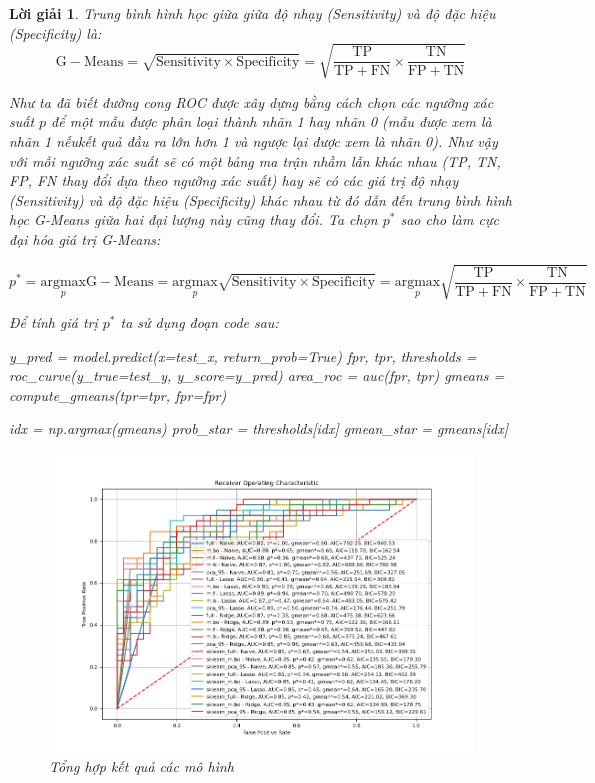 \documentclass[14pt, a4paper]{article}
\theoremstyle{sltheorem}
\theoremstyle{soltheorem}
\newtheorem*{loigiai}{Lời giải}
\begin{document}
\begin{loigiai}
    Trung bình hình học giữa giữa độ nhạy (Sensitivity) và độ đặc hiệu (Specificity) là:
    \begin{equation*}
        \mathrm{G-Means} = \sqrt{\mathrm{Sensitivity} \times \mathrm{Specificity}} = \sqrt{\dfrac{\mathrm{TP}}{\mathrm{TP} + \mathrm{FN}} \times \dfrac{\mathrm{TN}}{\mathrm{FP} + \mathrm{TN}}}
    \end{equation*}

    Như ta đã biết đường cong ROC được xây dựng bằng cách chọn các ngưỡng xác suất $p$ để một mẫu được phân loại thành nhãn 1 hay nhãn 0 (mẫu được xem là nhãn 1 nếukết quả đầu ra lớn hơn 1 và ngược lại được xem là nhãn 0).
    Như vậy với mỗi ngưỡng xác suất sẽ có một bảng ma trận nhầm lẫn khác nhau (TP, TN, FP, FN thay đổi dựa theo ngưỡng xác suất) hay sẽ có các giá trị độ nhạy (Sensitivity) và độ đặc hiệu (Specificity) khác nhau từ đó dẫn đến trung bình hình học G-Means giữa hai đại lượng này cũng thay đổi.
    Ta chọn $p^*$ sao cho làm cực đại hóa giá trị G-Means:

    \begin{equation*}
        p^* = \underset{p}{\mathrm{argmax}} \mathrm{G-Means} = \underset{p}{\mathrm{argmax}} \sqrt{\mathrm{Sensitivity} \times \mathrm{Specificity}} = \underset{p}{\mathrm{argmax}} \sqrt{\dfrac{\mathrm{TP}}{\mathrm{TP} + \mathrm{FN}} \times \dfrac{\mathrm{TN}}{\mathrm{FP} + \mathrm{TN}}}
    \end{equation*}

    Để tính giá trị $p^*$ ta sử dụng đoạn code sau:

    \begin{python}
y_pred = model.predict(x=test_x, return_prob=True)
fpr, tpr, thresholds = roc_curve(y_true=test_y, y_score=y_pred)
area_roc = auc(fpr, tpr)
gmeans = compute_gmeans(tpr=tpr, fpr=fpr)
        
idx = np.argmax(gmeans)
prob_star = thresholds[idx]
gmean_star = gmeans[idx]
    \end{python}

    \begin{figure}[h!]
        \centering
        \includegraphics[width=1.0\textwidth]{figures/roc_curve_summary.png}
        \caption{Tổng hợp kết quả các mô hình}
        \label{fig:roc_curve_summary}
    \end{figure}


\end{loigiai}
\end{document}
